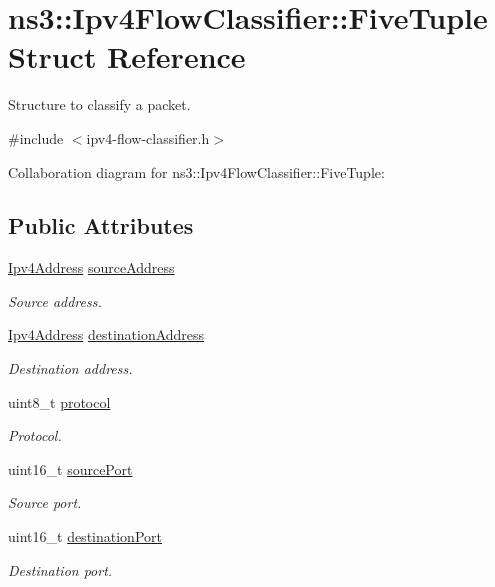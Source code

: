 \hypertarget{structns3_1_1Ipv4FlowClassifier_1_1FiveTuple}{}\section{ns3\+:\+:Ipv4\+Flow\+Classifier\+:\+:Five\+Tuple Struct Reference}
\label{structns3_1_1Ipv4FlowClassifier_1_1FiveTuple}


Structure to classify a packet.  




{\ttfamily \#include $<$ipv4-\/flow-\/classifier.\+h$>$}



Collaboration diagram for ns3\+:\+:Ipv4\+Flow\+Classifier\+:\+:Five\+Tuple\+:
\subsection*{Public Attributes}
\begin{DoxyCompactItemize}
\item 
\hyperlink{classns3_1_1Ipv4Address}{Ipv4\+Address} \hyperlink{structns3_1_1Ipv4FlowClassifier_1_1FiveTuple_a86df4297013242a6ca3b7b9cc8b40547}{source\+Address}
\begin{DoxyCompactList}\small\item\em Source address. \end{DoxyCompactList}\item 
\hyperlink{classns3_1_1Ipv4Address}{Ipv4\+Address} \hyperlink{structns3_1_1Ipv4FlowClassifier_1_1FiveTuple_a88466798ceb26c1152c1d5dd4336bbf5}{destination\+Address}
\begin{DoxyCompactList}\small\item\em Destination address. \end{DoxyCompactList}\item 
uint8\+\_\+t \hyperlink{structns3_1_1Ipv4FlowClassifier_1_1FiveTuple_a94e20ca3204cd84fe40f670bbad573d9}{protocol}
\begin{DoxyCompactList}\small\item\em Protocol. \end{DoxyCompactList}\item 
uint16\+\_\+t \hyperlink{structns3_1_1Ipv4FlowClassifier_1_1FiveTuple_a9a69077c620ebb31fc34788219d7331d}{source\+Port}
\begin{DoxyCompactList}\small\item\em Source port. \end{DoxyCompactList}\item 
uint16\+\_\+t \hyperlink{structns3_1_1Ipv4FlowClassifier_1_1FiveTuple_a57dc38b0a820ca5889d1d324424b3aa1}{destination\+Port}
\begin{DoxyCompactList}\small\item\em Destination port. \end{DoxyCompactList}\end{DoxyCompactItemize}


